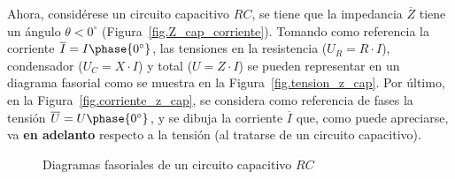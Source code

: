 \documentclass[11pt]{book} %
\numberwithin{dummy}{section}
\theoremstyle{ocrenumbox}
\theoremstyle{blacknumex}
\theoremstyle{blacknumbox}
\theoremstyle{ocrenum}
\newlength\esp
\begin{document}
	Ahora, considérese un circuito capacitivo $RC$, se tiene que la impedancia $\overline{Z}$ tiene un ángulo $\theta<0^\circ$ (Figura~\ref{fig.Z_cap_corriente}). Tomando como referencia la corriente $\overline{I}=I\phase{0^\circ}$, las tensiones en la resistencia ($U_R=R\cdot I$), condensador ($U_C=X\cdot I$) y total ($U=Z\cdot I$) se pueden representar en un diagrama fasorial como se muestra en la Figura~\ref{fig.tension_z_cap}. Por último, en la Figura~\ref{fig.corriente_z_cap}, se considera como referencia de fases la tensión $\overline{U}=U\phase{0^\circ}$, y se dibuja la corriente $\overline{I}$ que, como puede apreciarse, va \textbf{en adelanto} respecto a la tensión (al tratarse de un circuito capacitivo). 
	\begin{figure}[htbp]
		\centering
		\hfill
		\hfill
		\hfil
		\caption{Diagramas fasoriales de un circuito capacitivo $RC$}
		\label{fig.fasores_capacitivo_corrientes}
	\end{figure}
	
\end{document}

